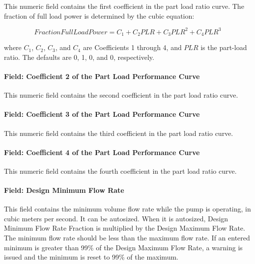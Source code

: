 This numeric field contains the first coefficient in the part load ratio curve. The fraction of full load power is determined by the cubic equation:

\begin{equation}
FractionFullLoadPower = C_1 + C_2 PLR + C_3 PLR^2 + C_4 PLR^3
\end{equation}

where \(C_1\), \(C_2\), \(C_3\), and \(C_4\) are Coefficients 1 through 4, and \(PLR\) is the part-load ratio. The defaults are 0, 1, 0, and 0, respectively.

\paragraph{Field: Coefficient 2 of the Part Load Performance Curve}\label{field-coefficient-2-of-the-part-load-performance-curve}

This numeric field contains the second coefficient in the part load ratio curve.

\paragraph{Field: Coefficient 3 of the Part Load Performance Curve}\label{field-coefficient-3-of-the-part-load-performance-curve}

This numeric field contains the third coefficient in the part load ratio curve.

\paragraph{Field: Coefficient 4 of the Part Load Performance Curve}\label{field-coefficient-4-of-the-part-load-performance-curve}

This numeric field contains the fourth coefficient in the part load ratio curve.

\paragraph{Field: Design Minimum Flow Rate}\label{field-design-minimum-flow-rate}

This field contains the minimum volume flow rate while the pump is operating, in cubic meters per second. It can be autosized. When it is autosized, Design Minimum Flow Rate Fraction is multiplied by the Design Maximum Flow Rate. The minimum flow rate should be less than the maximum flow rate. If an entered minimum is greater than 99\% of the Design Maximum Flow Rate, a warning is issued and the minimum is reset to 99\% of the maximum.

